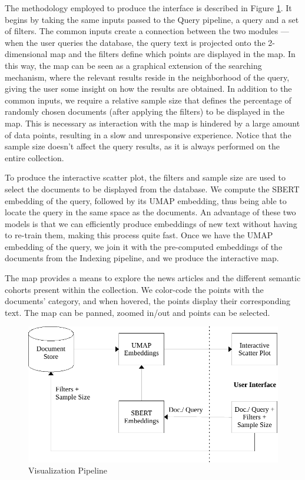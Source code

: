\documentclass[a4paper]{article}
\begin{document}
The methodology employed to produce the interface is described in Figure \ref{vis_pipeline}. It begins by taking the same inputs passed to the Query pipeline, a query and a set of filters. The common inputs create a connection between the two modules — when the user queries the database, the query text is projected onto the 2-dimensional map and the filters define which points are displayed in the map. In this way, the map can be seen as a graphical extension of the searching mechanism, where the relevant results reside in the neighborhood of the query, giving the user some insight on how the results are obtained. In addition to the common inputs, we require a relative sample size that defines the percentage of randomly chosen documents (after applying the filters) to be displayed in the map. This is necessary as interaction with the map is hindered by a large amount of data points, resulting in a slow and unresponsive experience. Notice that the sample size doesn't affect the query results, as it is always performed on the entire collection.

To produce the interactive scatter plot, the filters and sample size are used to select the documents to be displayed from the database. We compute the SBERT embedding of the query, followed by its UMAP embedding, thus being able to locate the query in the same space as the documents. An advantage of these two models is that we can efficiently produce embeddings of new text without having to re-train them, making this process quite fast. Once we have the UMAP embedding of the query, we join it with the pre-computed embeddings of the documents from the Indexing pipeline, and we produce the interactive map.

The map provides a means to explore the news articles and the different semantic cohorts present within the collection. We color-code the points with the documents' category, and when hovered, the points display their corresponding text. The map can be panned, zoomed in/out and points can be selected.

\begin{figure}[H]
	\centering
	\includegraphics[scale=0.7]{./figures/vis_pipeline}
	\caption{Visualization Pipeline}
	\label{vis_pipeline}
\end{figure}
\end{document}
